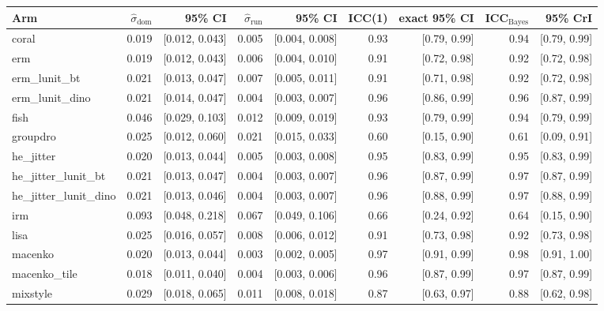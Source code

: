 \begin{tabular}{lrrrrrrrr}
\toprule
Arm & $\hat\sigma_\text{dom}$ & 95\% CI & $\hat\sigma_\text{run}$ & 95\% CI & ICC(1) & exact 95\% CI & ICC$_\text{Bayes}$ & 95\% CrI \\
\midrule
coral & 0.019 & [0.012, 0.043] & 0.005 & [0.004, 0.008] & 0.93 & [0.79, 0.99] & 0.94 & [0.79, 0.99] \\
erm & 0.019 & [0.012, 0.043] & 0.006 & [0.004, 0.010] & 0.91 & [0.72, 0.98] & 0.92 & [0.72, 0.98] \\
erm\_lunit\_bt & 0.021 & [0.013, 0.047] & 0.007 & [0.005, 0.011] & 0.91 & [0.71, 0.98] & 0.92 & [0.72, 0.98] \\
erm\_lunit\_dino & 0.021 & [0.014, 0.047] & 0.004 & [0.003, 0.007] & 0.96 & [0.86, 0.99] & 0.96 & [0.87, 0.99] \\
fish & 0.046 & [0.029, 0.103] & 0.012 & [0.009, 0.019] & 0.93 & [0.79, 0.99] & 0.94 & [0.79, 0.99] \\
groupdro & 0.025 & [0.012, 0.060] & 0.021 & [0.015, 0.033] & 0.60 & [0.15, 0.90] & 0.61 & [0.09, 0.91] \\
he\_jitter & 0.020 & [0.013, 0.044] & 0.005 & [0.003, 0.008] & 0.95 & [0.83, 0.99] & 0.95 & [0.83, 0.99] \\
he\_jitter\_lunit\_bt & 0.021 & [0.013, 0.047] & 0.004 & [0.003, 0.007] & 0.96 & [0.87, 0.99] & 0.97 & [0.87, 0.99] \\
he\_jitter\_lunit\_dino & 0.021 & [0.013, 0.046] & 0.004 & [0.003, 0.007] & 0.96 & [0.88, 0.99] & 0.97 & [0.88, 0.99] \\
irm & 0.093 & [0.048, 0.218] & 0.067 & [0.049, 0.106] & 0.66 & [0.24, 0.92] & 0.64 & [0.15, 0.90] \\
lisa & 0.025 & [0.016, 0.057] & 0.008 & [0.006, 0.012] & 0.91 & [0.73, 0.98] & 0.92 & [0.73, 0.98] \\
macenko & 0.020 & [0.013, 0.044] & 0.003 & [0.002, 0.005] & 0.97 & [0.91, 0.99] & 0.98 & [0.91, 1.00] \\
macenko\_tile & 0.018 & [0.011, 0.040] & 0.004 & [0.003, 0.006] & 0.96 & [0.87, 0.99] & 0.97 & [0.87, 0.99] \\
mixstyle & 0.029 & [0.018, 0.065] & 0.011 & [0.008, 0.018] & 0.87 & [0.63, 0.97] & 0.88 & [0.62, 0.98] \\

\end{tabular}
